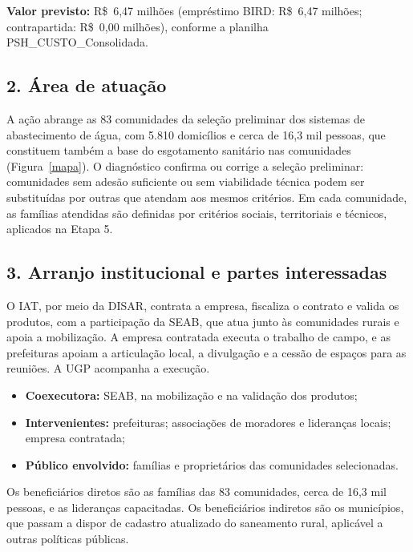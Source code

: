\textbf{Valor previsto:} R\$~6,47 milhões (empréstimo BIRD: R\$~6,47 milhões; contrapartida: R\$~0,00 milhões), conforme a planilha PSH\_CUSTO\_Consolidada.

{}
\subsection*{2. Área de atuação}

A ação abrange as 83 comunidades da seleção preliminar dos sistemas de abastecimento de água, com 5.810 domicílios e cerca de 16,3 mil pessoas, que constituem também a base do esgotamento sanitário nas comunidades (Figura~\ref{mapa}). O diagnóstico confirma ou corrige a seleção preliminar: comunidades sem adesão suficiente ou sem viabilidade técnica podem ser substituídas por outras que atendam aos mesmos critérios. Em cada comunidade, as famílias atendidas são definidas por critérios sociais, territoriais e técnicos, aplicados na Etapa 5.

{}
\subsection*{3. Arranjo institucional e partes interessadas}

O IAT, por meio da DISAR, contrata a empresa, fiscaliza o contrato e valida os produtos, com a participação da SEAB, que atua junto às comunidades rurais e apoia a mobilização. A empresa contratada executa o trabalho de campo, e as prefeituras apoiam a articulação local, a divulgação e a cessão de espaços para as reuniões. A UGP acompanha a execução.

\begin{itemize}
  \item \textbf{Coexecutora:} SEAB, na mobilização e na validação dos produtos;
  \item \textbf{Intervenientes:} prefeituras; associações de moradores e lideranças locais; empresa contratada;
  \item \textbf{Público envolvido:} famílias e proprietários das comunidades selecionadas.
\end{itemize}

Os beneficiários diretos são as famílias das 83 comunidades, cerca de 16,3 mil pessoas, e as lideranças capacitadas. Os beneficiários indiretos são os municípios, que passam a dispor de cadastro atualizado do saneamento rural, aplicável a outras políticas públicas.

